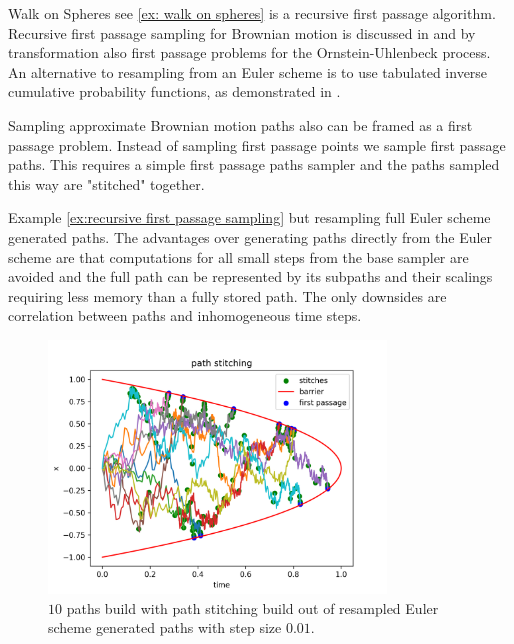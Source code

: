 \documentclass[a4paper,12pt]{article}
\begin{document}
\begin{related}
  Walk on Spheres see \ref{ex: walk on spheres} is a recursive first passage algorithm.
  Recursive first passage sampling for
  Brownian motion is discussed in \cite{herrmann_first-passage_2016}
  and by transformation also first passage problems for the
  Ornstein-Uhlenbeck process.
  An alternative to resampling from an Euler scheme is to use tabulated
  inverse cumulative probability functions,
  as demonstrated in \cite{hwang_simulationtabulation_2001}.
\end{related}


\begin{technique}
  Sampling approximate Brownian motion paths also can be
  framed as a first passage problem. Instead of sampling
  first passage points we sample first passage paths.
  This requires a simple first passage paths sampler and the paths
  sampled this way are "stitched" together.
\end{technique}

\begin{example}
  Example \ref{ex:recursive first passage sampling} but
  resampling full Euler scheme generated paths.
  The advantages over generating paths directly from
  the Euler scheme are that computations for all small steps from the
  base sampler are avoided and the full path
  can be represented by its subpaths and their scalings
  requiring less memory than a fully stored path.
  The only downsides are correlation between paths and
  inhomogeneous time steps.

  \begin{figure}[h!]
    \centering
    \includegraphics[width=0.8\textwidth]{plots/path_stitching_para.png}
    \caption{ $10$ paths build with path stitching build out of
      resampled Euler scheme generated paths with step size $0.01$.}
    \label{fig:path stitching para}
  \end{figure}
\end{example}
\end{document}
